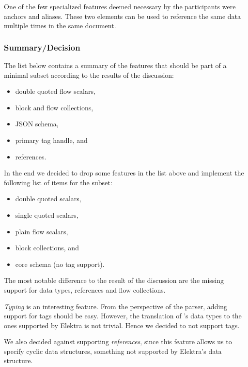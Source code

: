 One of the few specialized features deemed necessary by the participants were anchors and aliases. These two elements can be used to reference the same data multiple times in the same document.

\subsubsection{Summary/Decision}
\label{sec:discussion_summary_decision}

The list below contains a summary of the  features that should be part of a minimal  subset according to the results of the discussion:

\begin{itemize}
  \item double quoted flow scalars,
  \item block and flow collections,
  \item \gls{JSON} schema,
  \item primary tag handle, and
  \item references.
\end{itemize}

In the end we decided to drop some features in the list above and implement the following list of items for the  subset:

\begin{itemize}
  \item double quoted scalars,
  \item single quoted scalars,
  \item plain flow scalars,
  \item block collections, and
  \item core schema (no tag support).
\end{itemize}

The most notable difference to the result of the discussion are the missing support for data types, references and flow collections.

\emph{Typing} is an interesting feature. From the perspective of the parser, adding support for tags should be easy. However, the translation of ’s data types to the ones supported by Elektra is not trivial. Hence we decided to not support tags.

We also decided against supporting \emph{references}, since this feature allows us to specify cyclic data structures, something not supported by Elektra’s  data structure.

